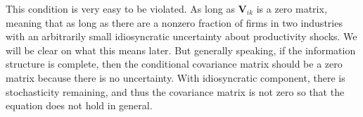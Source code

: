 \documentclass[12pt]{article}
\numberwithin{equation}{section}
\begin{document}
This condition is very easy to be violated. As long as $\mathbf{V}_{ik}$ is a zero matrix, meaning that as long as there are a nonzero fraction of firms in two industries with an arbitrarily small idiosyncratic uncertainty about productivity shocks. We will be clear on what this means later. But generally speaking, if the information structure is complete, then the conditional covariance matrix should be a zero matrix because there is no uncertainty. With idiosyncratic component, there is stochasticity remaining, and thus the covariance matrix is not zero so that the equation does not hold in general.





\end{document}
